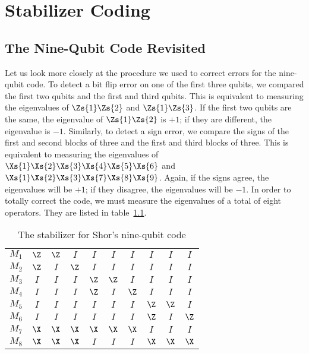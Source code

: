 \chapter{Stabilizer Coding}
\label{chap-stabilizers}

\section{The Nine-Qubit Code Revisited}

Let us look more closely at the procedure we used to correct errors for the
nine-qubit code.  To detect a bit flip error on one of the first three qubits,
we compared the first two qubits and the first and third qubits.  This is
equivalent to measuring the eigenvalues of $\Zs{1} \Zs{2}$ and $\Zs{1} \Zs{3}$.
If the first two qubits are the same, the eigenvalue of $\Zs{1} \Zs{2}$ is
$+1$; if they are different, the eigenvalue is $-1$.  Similarly, to detect a
sign error, we compare the signs of the first and second blocks of three and
the first and third blocks of three.  This is equivalent to measuring the
eigenvalues of $\Xs{1} \Xs{2} \Xs{3} \Xs{4} \Xs{5} \Xs{6}$ and $\Xs{1} \Xs{2}
\Xs{3} \Xs{7} \Xs{8} \Xs{9}$.  Again, if the signs agree, the eigenvalues will
be $+1$; if they disagree, the eigenvalues will be $-1$.  In order to totally
correct the code, we must measure the eigenvalues of a total of eight operators.
They are listed in table~\ref{table-9qubit}.
\begin{table}
	\centering
	\begin{tabular}{c|ccccccccc}
		$M_1$ & $\Z$ & $\Z$ & $I$ & $I$ & $I$ & $I$ & $I$ & $I$ & $I$ \\
		$M_2$ & $\Z$ & $I$ & $\Z$ & $I$ & $I$ & $I$ & $I$ & $I$ & $I$ \\
		$M_3$ & $I$ & $I$ & $I$ & $\Z$ & $\Z$ & $I$ & $I$ & $I$ & $I$ \\
		$M_4$ & $I$ & $I$ & $I$ & $\Z$ & $I$ & $\Z$ & $I$ & $I$ & $I$ \\
		$M_5$ & $I$ & $I$ & $I$ & $I$ & $I$ & $I$ & $\Z$ & $\Z$ & $I$ \\
		$M_6$ & $I$ & $I$ & $I$ & $I$ & $I$ & $I$ & $\Z$ & $I$ & $\Z$ \\
		$M_7$ & $\X$ & $\X$ & $\X$ & $\X$ & $\X$ & $\X$ & $I$ & $I$ & $I$ \\
		$M_8$ & $\X$ & $\X$ & $\X$ & $I$ & $I$ & $I$ & $\X$ & $\X$ & $\X$
	\end{tabular}
	\caption{The stabilizer for Shor's nine-qubit code}
	\label{table-9qubit}
\end{table}

